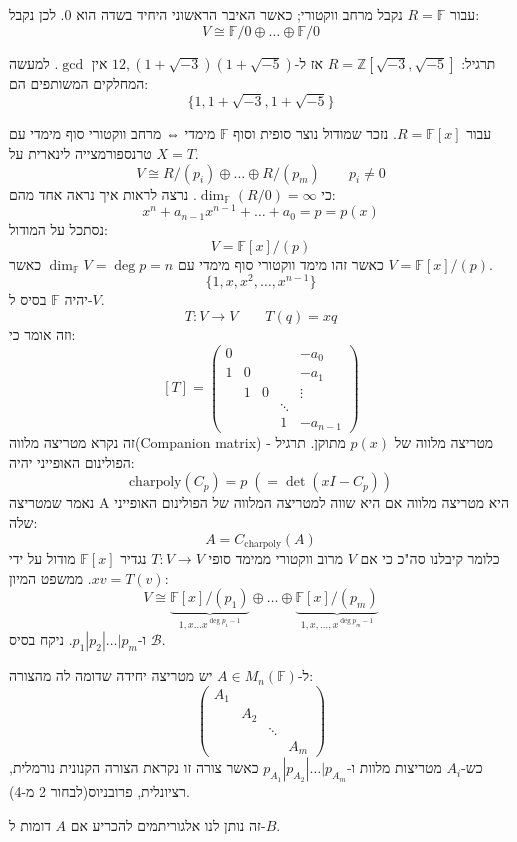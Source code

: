 \documentclass{tstextbook}
\begin{document}
\begin{example}
עבור \(R=\mathbb{F}\) נקבל מרחב ווקטורי; כאשר האיבר הראשוני היחיד בשדה הוא 0. לכן נקבל:
$$V\cong  \mathbb{F} / 0 \oplus \dots \oplus \mathbb{F} / 0$$

\end{example}
תרגיל: \(R=\mathbb{Z}[\sqrt{ -3 },\sqrt{ -5 }]\) אז ל-\(12,(1+\sqrt{ -3 })(1+\sqrt{ -5 })\) אין \(\gcd\). למעשה המחלקים המשותפים הם:
$$\{ 1,1+\sqrt{ -3 },1+\sqrt{ -5 } \}$$

\begin{example}
עבור \(R=\mathbb{F}[x]\). נזכר שמודול נוצר סופית וסוף \(\mathbb{F}\) מימדי ⇔ מרחב ווקטורי סוף מימדי עם טרנספורמצייה לינארית על \(X=T\).
$$V \cong  R / (p_{i})\oplus \dots \oplus R / (p_{m})\qquad p_{i}\neq 0$$
כי \(\dim_{\mathbb{F}}(R / 0)= \infty\).
נרצה לראות איך נראה אחד מהם:
$$x^{n}+a_{n-1}x^{n-1}+\dots+a_{0}=p=p(x)$$
נסתכל על המודול:
$$V=\mathbb{F} [x] / (p)$$
כאשר זהו מימד ווקטורי סוף מימדי עם \(\dim_{\mathbb{F}}V=\deg p = n\) כאשר \(V=\mathbb{F}[x] / (p)\).
$$\{ 1,x,x^{2},\dots,x^{n-1} \}$$
יהיה \(\mathbb{F}\) בסיס ל-\(V\).
$$T:V\to V\qquad T(q)=xq$$
וזה אומר כי:
$$[T]=\begin{pmatrix}0 &  &  &   & -a_{0}\\1 & 0 &  &   & -a_{1}\\ & 1 & 0 &   & \vdots\\ &  &  &  \ddots &  \\ &  &  & 1 & -a_{n-1}
\end{pmatrix}$$
זה נקרא מטריצה מלווה(Companion matrix) מטריצה מלווה של \(p(x)\) מתוקן.
תרגיל - הפולינום האופייני יהיה:
$$\text{charpoly}(C_{p})=p\;(=\det(xI-C_{p}))$$
נאמר שמטריצה A היא מטריצה מלווה אם היא שווה למטריצה המלווה של הפולינום האופייני שלה:
$$A=C_{\text{charpoly}}(A)$$
כלומר קיבלנו סה"כ כי אם \(V\) מרוב ווקטורי ממימד סופי \(T:V\to V\) נגדיר \(\mathbb{F}[x]\) מודול על ידי \(xv=T(v)\). ממשפט המיון:
$$V\cong  \underbrace{ \mathbb{F} [x] / (p_{1}) }_{ 1,x\dots x^{\deg p_{1}-1} }\oplus \dots \oplus \underbrace{ \mathbb{F}[x] / (p_{m}) }_{ 1,x ,\dots, x^{\deg p_{m}-1} } $$
ו-\(p_{1}|p_{2}|\dots|p_{m}\). ניקח בסיס \(\mathcal{B}\).

\end{example}
\begin{theorem}[פורובניוס]
ל-\(A\in M_{n}(\mathbb{F})\) יש מטריצה יחידה שדומה לה מהצורה:
$$\begin{pmatrix}A_{1} &  &   & \\   & A_{2} &   & \\ &  & \ddots  & \\ &  &  & A_{m}
\end{pmatrix}$$
כש-\(A_{i}\) מטריצות מלוות ו-\(p_{A_{1}}|p_{A_{2}}|\dots|p_{A_{m}}\) כאשר צורה זו נקראת הצורה הקנונית נורמלית, רציונלית, פרובניוס(לבחור 2 מ-4).

\end{theorem}
זה נותן לנו אלגוריתמים להכריע אם \(A\) דומות ל-\(B\).
\end{document}
